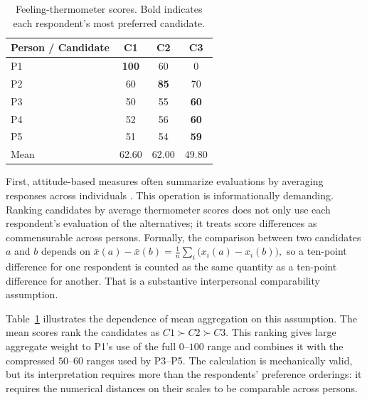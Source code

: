 \documentclass[12pt]{article}
\begin{document}
\begin{table}[h!]
  \centering
\begin{tabular}{lccc}
\toprule
\textbf{Person / Candidate} &  \textbf{C1} & \textbf{C2} & \textbf{C3} \\
\midrule
P1 & \textbf{100} & 60 & 0 \\
P2 & 60 & \textbf{85} & 70 \\
P3 & 50 & 55 & \textbf{60} \\
P4 & 52 & 56 & \textbf{60} \\
P5 & 51 & 54 & \textbf{59} \\
\midrule
Mean & 62.60 & 62.00 & 49.80 \\
\bottomrule
\end{tabular}
\caption{Feeling-thermometer scores. Bold indicates each respondent's most preferred candidate.}
\label{tab:mean}
\end{table}

First, attitude-based measures often summarize evaluations by averaging
responses across individuals \parencite{fuks22_polar_e_contex,
borba24_polar_ideol, mehlhaff23_group_based_approac_to_measur_polar}.
This operation is informationally demanding. Ranking candidates by average
thermometer scores does not only use each respondent's evaluation of the
alternatives; it treats score differences as commensurable across persons.
Formally, the comparison between two candidates \(a\) and \(b\) depends on
\(\bar{x}(a)-\bar{x}(b)
=
\frac{1}{n}\sum_i \bigl(x_i(a)-x_i(b)\bigr),
\) so a ten-point difference for one respondent is counted as the same
quantity as a ten-point difference for another. That is a substantive
interpersonal comparability assumption.

Table~\ref{tab:mean} illustrates the dependence of mean aggregation on this
assumption. The mean scores rank the candidates as \(C1 \succ C2 \succ C3\).
This ranking gives large aggregate weight to P1's use of the full
\(0\)--\(100\) range and combines it with the compressed \(50\)--\(60\)
ranges used by P3--P5. The calculation is mechanically valid, but its
interpretation requires more than the respondents' preference orderings: it
requires the numerical distances on their scales to be comparable across
persons.
\end{document}
